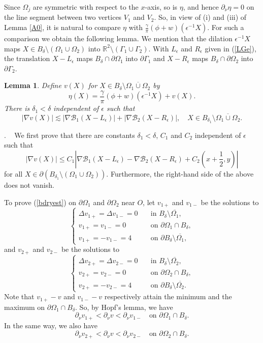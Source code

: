 \documentclass[11pt,a4paper]{article}
\numberwithin{equation}{section}
\newtheorem{lem}[thm]{Lemma}
\newcommand{\ds}{\displaystyle}
\newcommand{\pf}{\noindent {\sl Proof}. \ }
\newcommand{\p}{\partial}
\newcommand{\eqnref}[1]{(\ref {#1})}
\newcommand{\Rbb}{\mathbb{R}}
\newcommand{\Bcal}{\mathcal{B}}
\newcommand{\Gd}{\delta}
\newcommand{\Ge}{\epsilon}
\newcommand{\Gf}{\phi}
\newcommand{\Gg}{\gamma}
\newcommand{\Gn}{\eta}
\newcommand{\GD}{\Delta}
\newcommand{\GG}{\Gamma}
\newcommand{\GO}{\Omega}
\newcommand{\beq}{\begin{equation}}
\newcommand{\eeq}{\end{equation}}
\begin{document}
Since $\GO_j$ are symmetric with respect to the $x$-axis, so is $\Gn$, and hence $\p_\nu \Gn=0$ on the line segment between two vertices $V_1$ and $V_2$. So, in view of (i) and (iii) of Lemma \ref{A0}, it is natural to compare $\Gn$ with $\frac{\Gg}{\pi} \left( \Gf + w\right)(\Ge^{-1} X)$. For such a comparison we obtain the following lemma. We mention that the dilation $\Ge^{-1}X$ maps $X \in B_{\Gd} \setminus (\GO_1 \cup \GO_2)$ into $\Rbb^2 \setminus (\GG_1 \cup \GG_2)$. With $L_\Ge$ and $R_\Ge$ given in \eqnref{LGe}, the translation $X-L_\Ge$ maps $B_{\Gd} \cap \p\GO_1$ into $\p\GG_1$ and $X-R_\Ge$ maps $B_{\Gd} \cap \p\GO_2$ into $\p\GG_2$.

\begin{lem}\label{lemma_B_1}
Define $v(X)$ for $X \in B_{\Gd} \setminus \overline{\GO_1 \cup \GO_2}$ by
\beq\label{decomp_Q}
\Gn (X)=  \frac{\Gg}{\pi} \left( \Gf + w\right)(\Ge^{-1} X) + v (X).
\eeq
There is $\Gd_1<\Gd$ independent of $\Ge$ such that
\beq\label{nablavest}
| \nabla v (X)| \lesssim | \nabla \Bcal_1 (X-L_\Ge) | + | \nabla \Bcal_2 (X-R_\Ge) |, \quad X \in  B_{\Gd_1} \setminus \overline {\GO_1 \cup \GO_2}.
\eeq
\end{lem}

\pf
We first prove that there are constants $\Gd_1< \Gd$, $C_1$ and $C_2$ independent of $\Ge$ such that
\beq\label{bdryest}
|\nabla  v (X)| \leq C_1 \left| \nabla \Bcal_1 (X-L_\Ge) - \nabla \Bcal_2 (X - R_\Ge) + C_2 \left(x + \frac 1 2,y\right) \right |
\eeq
for all $X \in \p (B_{\Gd_1} \setminus (\GO_1 \cup \GO_2))$. Furthermore, the right-hand side of the above does not vanish.

To prove \eqnref{bdryest} on $\p\GO_1$ and $\p\GO_2$ near $O$, let $v_{1+}$ and $v_{1-}$ be the solutions to
\beq
\begin{cases}
\ds \GD v_{1+}=\GD v_{1-} =  0  \quad &\mbox{in } B_{\Gd} \setminus \overline{\GO_1}, \\
\ds v_{1+}=v_{1-} = 0   \quad &\mbox{on } \p\GO_1 \cap B_{\Gd}, \\
\ds v_{1+}=- v_{1-} = 4   \quad &\mbox{on }  \p  B_{\Gd} \setminus \overline{\GO_1},
\end{cases}
\eeq
and $v_{2+}$ and $v_{2-}$ be the solutions to
\beq
\begin{cases}
\ds \GD v_{2+}=\GD v_{2-} =  0  \quad &\mbox{in } B_{\Gd} \setminus  \overline{\GO_2},\\
\ds v_{2+}=v_{2-} = 0   \quad &\mbox{on } \p\GO_2 \cap B_{\Gd} , \\
\ds v_{2+}=- v_{2-} = 4   \quad &\mbox{on }  \p B_{\Gd} \setminus \overline{\GO_2}.
\end{cases}
\eeq
Note that $v_{1+} - v$ and $v_{1-} - v$ respectively attain the minimum and the maximum on $\p\GO_1 \cap B_{\Gd}$. So, by Hopf's lemma, we have
\beq\label{hopf1}
\p_{\nu} v_{1+}   < \p_{\nu} v < \p_{\nu} v_{1-} \quad\mbox{on } \p\GO_1 \cap B_{\Gd} .
\eeq
In the same way, we also have
\beq\label{hopf2}
\p_{\nu} v_{2+}   < \p_{\nu} v < \p_{\nu} v_{2-} \quad\mbox{on } \p\GO_2 \cap B_{\Gd} .
\eeq
\end{document}
